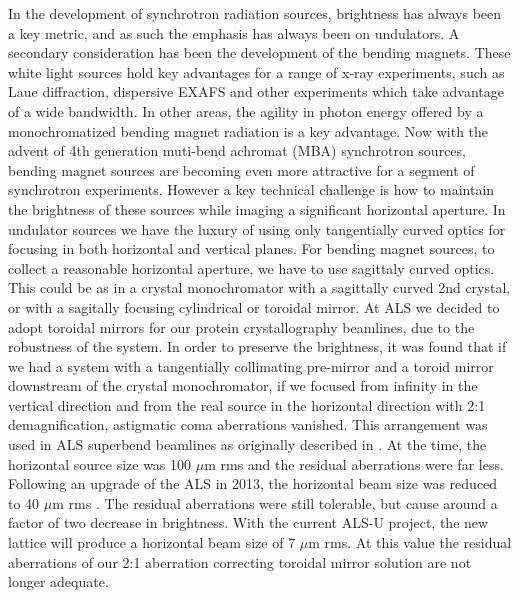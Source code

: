 \documentclass{iucr}              %
\begin{document}
In the development of synchrotron radiation sources, brightness has always been a key metric, and as such the emphasis has always been on undulators.  A secondary consideration has been the development of the bending magnets. These white light sources hold key advantages for a range of x-ray experiments, such as Laue diffraction, dispersive EXAFS and other experiments which take advantage of a wide bandwidth.  In other areas, the agility in photon energy offered by a monochromatized bending magnet radiation is a key advantage.  Now with the advent of 4th generation muti-bend achromat (MBA) synchrotron sources, bending magnet sources are becoming even more attractive for a segment of synchrotron experiments.  However a key technical challenge is how to maintain the brightness of these sources while imaging a significant horizontal aperture.  In undulator sources we have the luxury of using only tangentially curved optics for focusing in both horizontal and vertical planes.  For bending magnet sources, to collect a reasonable horizontal aperture, we have to use sagittaly curved optics.  This could be as in a crystal monochromator with a sagittally curved 2nd crystal, or with a sagitally focusing cylindrical or toroidal mirror.  At ALS we decided to adopt toroidal mirrors for our protein crystallography beamlines, due to the robustness of the system.  In order to preserve the brightness, it was found that if we had a system with a tangentially collimating pre-mirror and a toroid mirror downstream of the crystal monochromator, if we focused from infinity in the vertical direction and from the real source in the horizontal direction with 2:1 demagnification,  astigmatic coma aberrations vanished. This arrangement was used in ALS superbend beamlines as originally described in  \cite{MacDowell2004}.
At the time, the horizontal source size was 100 $\mu$m rms and the residual aberrations were far less.  Following an upgrade of the ALS in 2013, the horizontal beam size was reduced to 40 $\mu$m  rms \cite{Steier_2014}. The residual aberrations were still tolerable, but cause around a factor of two decrease in brightness.  With the current ALS-U project, the new lattice will produce a horizontal beam size of 7 $\mu$m rms.  At this value the residual aberrations of our 2:1 aberration correcting toroidal mirror solution are not longer adequate.
\end{document}
